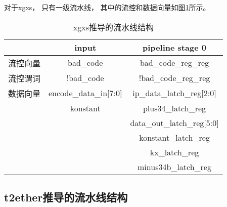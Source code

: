 对于xgxs，
只有一级流水线，
其中的流控和数据向量如图\ref{tab_xgxs}所示。

\begin{table}[b]
\centering
\caption{xgxs推导的流水线结构}
\begin{tabular}{|c|c|c|}
\hline
                       & input                  &  pipeline stage 0    \\\hline\hline
流控向量               &bad\_code               & bad\_code\_reg\_reg\\\hline
流控谓词               &!bad\_code              & !bad\_code\_reg\_reg \\\hline
数据向量               &encode\_data\_in[7:0]   &ip\_data\_latch\_reg[2:0] \\
                       &konstant                &plus34\_latch\_reg     \\
                       &                        &data\_out\_latch\_reg[5:0]\\
                       &                        &konstant\_latch\_reg   \\
                       &                        &kx\_latch\_reg         \\
                       &                        &minus34b\_latch\_reg   \\\hline
\end{tabular}\label{tab_xgxs}
\end{table}


\subsection{t2ether推导的流水线结构}


